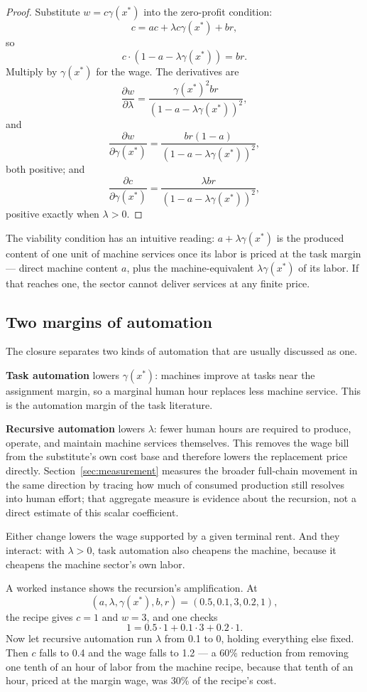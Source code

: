 \documentclass[12pt]{article}
\theoremstyle{plain}
\begin{document}
\begin{proof}
Substitute $w=c\gamma(x^*)$ into the zero-profit condition:
\[
c = ac + \lambda c\gamma(x^*) + br,
\]
so
\[
c\cdot(1-a-\lambda\gamma(x^*)) = br.
\]
Multiply by $\gamma(x^*)$ for the wage. The derivatives are
\[
\frac{\partial w}{\partial\lambda}
=
\frac{\gamma(x^*)^2br}
     {(1-a-\lambda\gamma(x^*))^2},
\]
and
\[
\frac{\partial w}{\partial\gamma(x^*)}
=
\frac{br(1-a)}
     {(1-a-\lambda\gamma(x^*))^2},
\]
both positive; and
\[
\frac{\partial c}{\partial\gamma(x^*)}
=
\frac{\lambda br}
     {(1-a-\lambda\gamma(x^*))^2},
\]
positive exactly when $\lambda>0$.
\end{proof}

The viability condition has an intuitive reading:
$a+\lambda\gamma(x^*)$ is the produced content of one unit of machine services
once its labor is priced at the task margin --- direct machine content $a$, plus
the machine-equivalent $\lambda\gamma(x^*)$ of its labor. If that reaches one,
the sector cannot deliver services at any finite price.


\subsection{Two margins of automation}

The closure separates two kinds of automation that are usually discussed as one.

\textbf{Task automation} lowers $\gamma(x^*)$: machines improve at tasks near the
assignment margin, so a marginal human hour replaces less machine service. This
is the automation margin of the task literature.

\textbf{Recursive automation} lowers $\lambda$: fewer human hours are required to
produce, operate, and maintain machine services themselves. This removes the wage
bill from the substitute's own cost base and therefore lowers the replacement
price directly. Section~\ref{sec:measurement} measures the broader full-chain movement in the same direction by tracing how much of consumed production still resolves into human effort; that aggregate measure is evidence about the recursion, not a direct estimate of this scalar coefficient.

Either change lowers the wage supported by a given terminal rent. And they
interact: with $\lambda>0$, task automation also cheapens the machine, because it
cheapens the machine sector's own labor.

A worked instance shows the recursion's amplification. At
\[
(a,\lambda,\gamma(x^*),b,r)=(0.5,0.1,3,0.2,1),
\]
the recipe gives $c=1$ and $w=3$, and one checks
\[
1 = 0.5\cdot1 + 0.1\cdot3 + 0.2\cdot1.
\]
Now let recursive automation run $\lambda$ from 0.1 to 0, holding everything
else fixed. Then $c$ falls to 0.4 and the wage falls to 1.2 --- a 60\% reduction
from removing one tenth of an hour of labor from the machine recipe, because
that tenth of an hour, priced at the margin wage, was 30\% of the recipe's cost.
\end{document}
